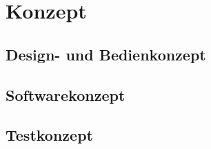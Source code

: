 \chapter{Konzept}

\label{AppendixKonzept}

\section{Design- und Bedienkonzept}\label{design--und-bedienkonzept}

\section{Softwarekonzept}\label{softwarekonzept}

\section{Testkonzept}\label{testkonzept}
